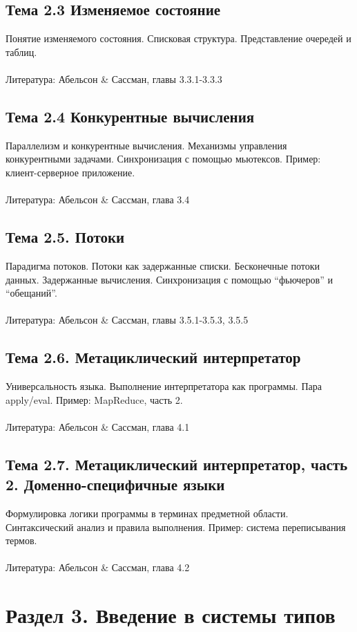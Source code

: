 \documentclass[a4paper,10pt]{article}
\begin{document}
\subsection*{Тема 2.3 Изменяемое состояние}
Понятие изменяемого состояния. Списковая структура. Представление очередей
и таблиц.
\\\\
Литература: Абельсон \& Сассман, главы 3.3.1-3.3.3

\subsection*{Тема 2.4 Конкурентные вычисления}
Параллелизм и конкурентные вычисления. Механизмы управления конкурентными
задачами. Синхронизация с помощью мьютексов. Пример: клиент-серверное приложение.
\\\\
Литература: Абельсон \& Сассман, глава 3.4

\subsection*{Тема 2.5. Потоки}
Парадигма потоков. Потоки как задержанные списки. Бесконечные потоки данных.
Задержанные вычисления. Синхронизация с помощью ``фьючеров'' и ``обещаний''.
\\\\
Литература: Абельсон \& Сассман, главы 3.5.1-3.5.3, 3.5.5

\subsection*{Тема 2.6. Метациклический интерпретатор}
Универсальность языка. Выполнение интерпретатора как программы. Пара apply/eval.
Пример: MapReduce, часть 2.
\\\\
Литература: Абельсон \& Сассман, глава 4.1

\subsection*{Тема 2.7. Метациклический интерпретатор, часть 2. Доменно-специфичные языки}
Формулировка логики программы в терминах предметной области. Синтаксический
анализ и правила выполнения. Пример: система переписывания термов.
\\\\
Литература: Абельсон \& Сассман, глава 4.2

\section*{Раздел 3. Введение в системы типов}
\end{document}
